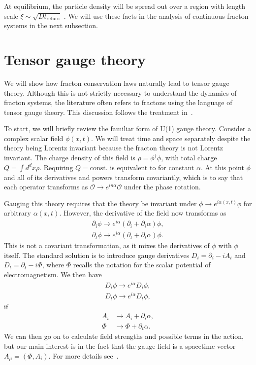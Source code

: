 \documentclass[a4paper,11pt]{article}
\newcommand{\ret}{\text{return}}
\newcommand{\nn}{\nonumber\\}
\newcommand{\note}[1]{{\color{red}{#1}}}
\begin{document}
At equilibrium, the particle density will be spread out over a region with length scale $\xi\sim\sqrt{Dt_\ret}$ \note{(Why?)}. We will use these facts in the analysis of continuous fracton systems in the next subsection.


\section{Tensor gauge theory} \label{sec:tensor}

We will show how fracton conservation laws naturally lead to tensor gauge theory. Although this is not strictly necessary to understand the dynamics of fracton systems, the literature often refers to fractons using the language of tensor gauge theory. This discussion follows the treatment in~\cite{PretkoFractonGauge}. 

To start, we will briefly review the familiar form of U(1) gauge theory. Consider a complex scalar field $\phi(x,t)$. We will treat time and space separately despite the theory being Lorentz invariant because the fracton theory is not Lorentz invariant. The charge density of this field is $\rho =\phi^\dag\phi$, with total charge $Q=\int d^dx \rho$. Requiring $Q=\text{const.}$ is equivalent to \note{requiring
	\begin{align}
	\phi\to e^{i\alpha}\phi
	\end{align}	
	be a symmetry of the theory,} for constant $\alpha$. At this point $\phi$ and all of its derivatives and powers transform covariantly, which is to say that each operator transforms as $\mathcal{O}\to e^{in\alpha}\mathcal{O}$ under the phase rotation.

Gauging this theory requires that the theory be invariant under $\phi\to e^{i\alpha(x,t)}\phi$ for arbitrary $\alpha(x,t)$. However, the derivative of the field now transforms as 
\begin{align}
\partial_i\phi\to e^{i\alpha}\left(\partial_i+\partial_i\alpha\right)\phi,\nn
\partial_t\phi\to e^{i\alpha}\left(\partial_t+\partial_t\alpha\right)\phi.
\label{eqn:nconv}
\end{align}
This is not a covariant transformation, as it mixes the derivatives of $\phi$ with $\phi$ itself. The standard solution is to introduce gauge derivatives $D_i=\partial_i-iA_i$ and $D_t=\partial_t-i\Phi$, where $\Phi$ recalls the notation for the scalar potential of electromagnetism. We then have 
\begin{align}
D_i\phi\to e^{i\alpha}D_i\phi,\nn
D_t\phi\to e^{i\alpha}D_t\phi,
\end{align}
if 
\begin{align}
A_i &\to A_i+\partial_i\alpha, \nn
\Phi&\to\Phi+\partial_t\alpha.
\end{align}
We can then go on to calculate field strengths and possible terms in the action, but our main interest is in the fact that the gauge field is a spacetime vector $A_\mu=(\Phi,A_i)$. For more details see~\cite{PretkoFractonGauge}.
\end{document}
